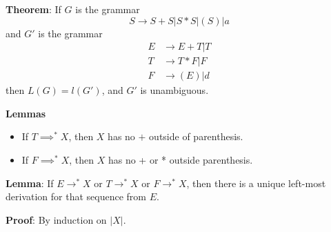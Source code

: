 \documentclass[12pt]{article}
\begin{document}
\textbf{Theorem}: If $G$ is the grammar
\begin{equation}
	S \to S + S | S * S | (S)|a
	\label{grammar2}
\end{equation}
and $G'$ is the grammar
\begin{equation}
	\begin{split}
	E &\to E + T |T\\
	T &\to T*F|F\\
	F &\to(E)|d
	\end{split}
	\label{grammar3}
\end{equation}
then $L(G) = l(G')$, and $G'$ is unambiguous.

\textbf{Lemmas}
\begin{itemize}
	\item If $T \implies^* X$, then $X$ has no $+$ outside of parenthesis.
	\item If $F \implies^* X$, then $X$ has no + or * outside parenthesis.
\end{itemize}

\textbf{Lemma}: If $E \to^* X$ or $T \to^* X$ or $F \to^*X$, then there is a
unique left-most derivation for that sequence from $E$.

\textbf{Proof}: By induction on $|X|$.
\end{document}
